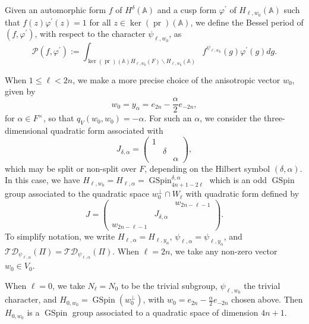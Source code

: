 \documentclass[12pt]{amsart}
\newcommand{\A}{\mathbb{A}}
\newcommand{\TD}{\mathcal{TD}}
\theoremstyle{remark}
\newcommand{\pr}{\operatorname{pr}}
\DeclareMathOperator{\GSpin}{GSpin}
\begin{document}
Given an automorphic form $f$ of $H^{\delta}(\A)$ and a cusp form $\varphi^\prime$ of $H_{\ell,w_0}(\A)$ such that $f(z)\varphi^\prime(z)=1$ for all $z\in \ker(\pr)(\A)$, we define the Bessel period of $(f, \varphi^\prime)$, with respect to the character $\psi_{\ell, w_0}$, as
\begin{equation*}
\mathcal{P}(f, \varphi^\prime):=\int_{ \ker(\pr)(\A) H_{\ell,w_0}(F)\backslash H_{\ell,w_0}(\A)} f^{\psi_{\ell, w_0}}(g) \varphi^\prime(g)dg.	
\end{equation*}



When $1\le \ell<2n$, we make a more precise choice of the anisotropic vector $w_0$, given by 
\begin{equation}
\label{eq-w_0-global}
w_0=y_{\alpha}=e_{2n}-\frac{\alpha}{2}e_{-2n}, 	
\end{equation}
for $\alpha\in F^\times$, so that $q_V(w_0, w_0)=-\alpha$. 
For such an $\alpha$, we consider the three-dimensional quadratic form associated with 
\begin{equation}
\label{eq-J-delta-alpha}
J_{\delta, \alpha}=\left(\begin{smallmatrix} 1&&\\&\delta&\\&&\alpha\end{smallmatrix}\right), 
\end{equation}
which may be split or non-split over $F$, depending on the Hilbert symbol $(\delta, \alpha)$. 
In this case, we have $H_{\ell,w_0}=H_{\ell,\alpha}=\GSpin_{4n+1-2\ell}^{\delta, \alpha}$ which is an odd $\GSpin$ group associated to the quadratic space 
$
w_0^\perp \cap W_{\ell}
$
with quadratic form defined by
\begin{equation}
\label{eq-matrix-quad-form-on-4n-2l+1}
J=\left( \begin{smallmatrix}
   &&w_{2n-\ell-1}\\&J_{\delta,\alpha}&\\w_{2n-\ell-1}&&
  \end{smallmatrix}\right).
\end{equation}
To simplify notation, we write $H_{\ell, \alpha}=H_{\ell, y_\alpha}$, $\psi_{\ell, \alpha}=\psi_{\ell, y_\alpha}$, and $\TD_{\psi_{\ell, \alpha}}(\Pi)=\TD_{\psi_{\ell,\alpha}}(\Pi)$.
When $\ell=2n$, we take any non-zero vector $w_0\in V_0$.
 

When $\ell=0$, we take $N_{\ell}=N_{0}$ to be the trivial subgroup, $\psi_{\ell,w_0}$ the trivial character, and $H_{0,w_0}=\GSpin(w_0^\perp)$, with $w_0=e_{2n}-\frac{\alpha}{2}e_{-2n}$ chosen above. Then $H_{0, w_0}$ is a $\GSpin$ group associated to a quadratic space of dimension $4n+1$.
\end{document}
